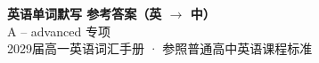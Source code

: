 \documentclass[10pt,a4paper]{article}
\begin{document}
\pagestyle{plain}

\begin{center}
{\LARGE\bfseries 英语单词默写 \quad 参考答案（英 $\to$ 中）}\\[0.22em]
{\large A -- advanced \quad 专项}\\[0.18em]
{\small 2029届高一英语词汇手册 · 参照普通高中英语课程标准}
\end{center}

\vspace{0.2em}
\noindent{\color{rulegray}\rule{\textwidth}{0.8pt}}

\vspace{0.35em}

\vspace{0.25em}
\renewcommand{\arraystretch}{1.62}
\end{document}
